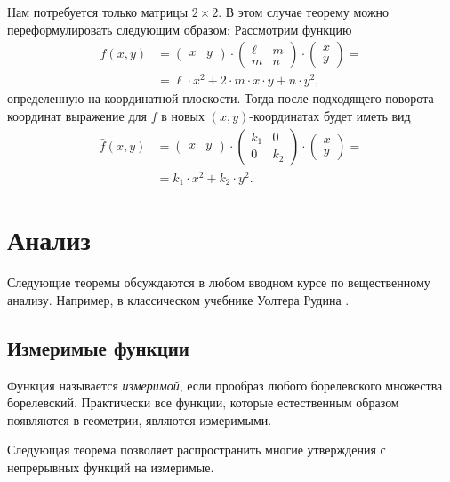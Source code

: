 \begin{multicols}{2}
{Нам потребуется только матрицы $2{\times}2$.
В этом случае теорему можно переформулировать следующим образом:
Рассмотрим функцию
\begin{align*}
f(x,y)&=
\begin{pmatrix}
x&y
\end{pmatrix}
\cdot
\begin{pmatrix}
\ell&m
\\
m&n
\end{pmatrix}
\cdot
\begin{pmatrix}
x\\y
\end{pmatrix}=
\\
&=\ell\cdot x^2+2\cdot m\cdot x\cdot y+n\cdot y^2,
\end{align*}
определенную на координатной плоскости.
Тогда после подходящего поворота координат
выражение для $f$ в новых $(x,y)$-координатах будет иметь вид
\begin{align*}
\bar f(x,y)&=
\begin{pmatrix}
x&y
\end{pmatrix}
\cdot
\begin{pmatrix}
k_1&0
\\
0&k_2
\end{pmatrix}
\cdot
\begin{pmatrix}
x\\y
\end{pmatrix}=
\\
&=k_1\cdot x^2+k_2\cdot y^2.
\end{align*}

\section{Анализ}\label{sec:analysis}

Следующие теоремы обсуждаются в любом вводном курсе по вещественному анализу.
Например, в классическом учебнике Уолтера Рудина \cite{rudin}.

\subsection*{Измеримые функции}

Функция называется \emph{измеримой}, если прообраз любого борелевского множества борелевский.
Практически все функции, которые естественным образом появляются в геометрии, являются измеримыми.

Следующая теорема позволяет распространить многие утверждения с непрерывных функций на измеримые.

}
\end{multicols}
